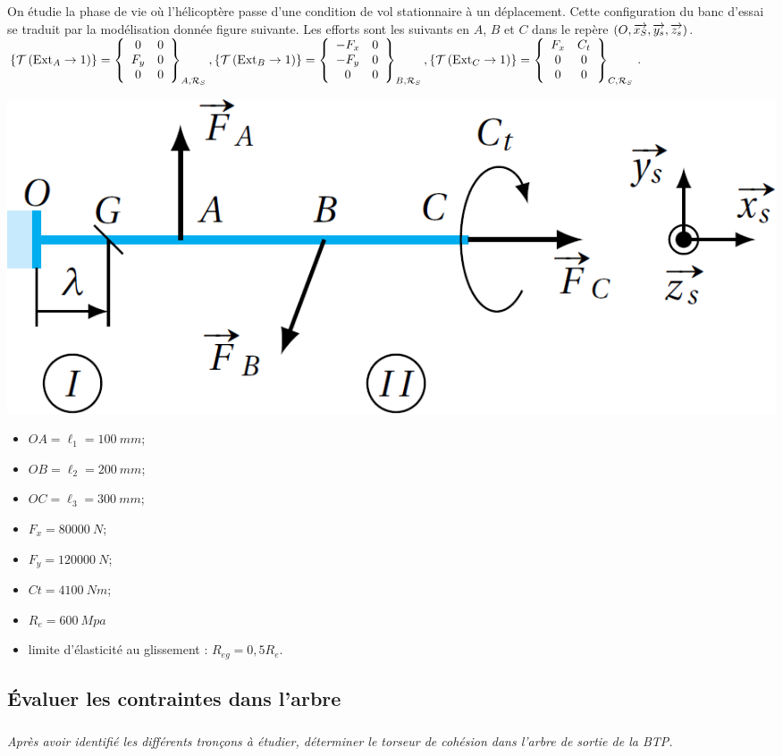 \documentclass[10pt,fleqn]{article} %
\begin{document}
\begin{multicols}{2}
On étudie la phase de vie où l’hélicoptère passe d’une condition de vol stationnaire
à un déplacement. Cette configuration du banc d’essai se traduit par la modélisation
donnée figure suivante. Les efforts sont les suivants en $A$, $B$ et $C$ dans le repère $\repere{O}{x_S}{y_s}{z_s}$.
$
\torseurstat{T}{\text{Ext}_A}{1} = \torseurcol{0}{F_y}{0}{0}{0}{0}{A,\mathcal{R}_S}, 
\torseurstat{T}{\text{Ext}_B}{1} = \torseurcol{-F_x}{-F_y}{0}{0}{0}{0}{B,\mathcal{R}_S}, 
\torseurstat{T}{\text{Ext}_C}{1} = \torseurcol{F_x}{0}{0}{C_t}{0}{0}{C,\mathcal{R}_S}
$.

\begin{center}
\includegraphics[width=\linewidth]{images/fig_05}
\end{center}

\begin{multicols}{2}
\begin{itemize}
\item $OA = \ell_1 = \SI{100}{mm}$;
\item $OB = \ell_2 = \SI{200}{mm}$;
\item $OC = \ell_3 = \SI{300}{mm}$;
\item $F_x = \SI{80000}{N}$; 
\item $F_y = \SI{120000}{N}$;
\item $Ct = \SI{4100}{Nm}$;
\item $R_e = \SI{600}{Mpa}$ 
\item limite d’élasticité au glissement : $R_{eg} = 0,5R_e$.
\end{itemize}
\end{multicols}


\subsection*{Évaluer les contraintes dans l’arbre}

\subparagraph{}\textit{Après avoir identifié les différents tronçons à étudier, déterminer le torseur de
cohésion dans l’arbre de sortie de la BTP.}


\end{multicols}
\end{document}
